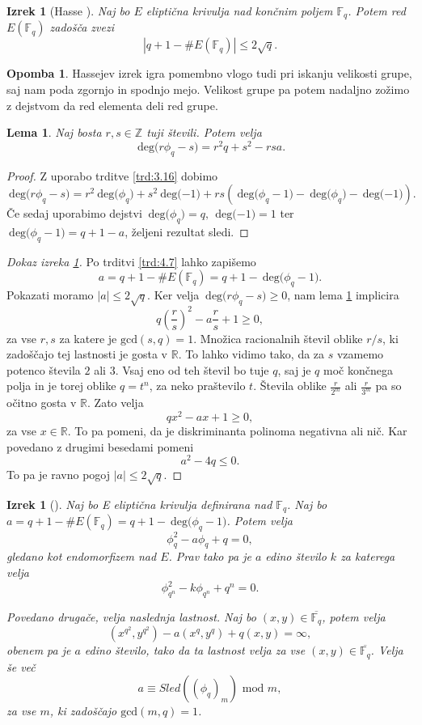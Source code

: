 \documentclass[12pt,a4paper,twoside]{article}
\theoremstyle{definition} %
\newtheorem{opomba}[definicija]{Opomba}
\theoremstyle{plain} %
\newtheorem{lema}[definicija]{Lema}
\newtheorem{izrek}[definicija]{Izrek}
\numberwithin{equation}{section}  %
\newcommand{\R}{\mathbb R}
\newcommand{\Z}{\mathbb Z}
\newcommand{\F}{\mathbb F}
\newcommand{\E}[1]{E({#1})}
\newcommand{\DEG}[1]{\ \text{deg(}{#1}\text{)}}
\begin{document}
\begin{izrek}[Hasse ]
\label{izr:Hasse}
Naj bo $E$ eliptična krivulja nad končnim poljem $\F_q$.  Potem red $\E{\F_q}$ zadošča zvezi
$$|q+1-\#\E{\F_q}| \leq 2\sqrt{q}.$$
\end{izrek}

\begin{opomba}
Hassejev izrek igra pomembno vlogo tudi pri iskanju velikosti grupe, saj nam poda zgornjo in spodnjo mejo. Velikost grupe pa potem nadaljno zožimo z dejstvom da red elementa deli red grupe. 
\end{opomba}

\begin{lema}
\label{lema:hasse}
Naj bosta $r,s \in \Z$ tuji števili. Potem velja
$$\DEG{r\phi_q-s} = r^2q+s^2-rsa.$$
\end{lema}

\begin{proof}
Z uporabo trditve \ref{trd:3.16} dobimo
$$\DEG{r\phi_q-s} = r^2\DEG{\phi_q}+s^2\DEG{-1}+rs(\DEG{\phi_q-1}-\DEG{\phi_q}-\DEG{-1}).$$
Če sedaj uporabimo dejstvi $\DEG{\phi_q} = q,\ \DEG{-1} = 1$ ter $\DEG{\phi_q-1} = q+1-a$, željeni rezultat sledi.
\end{proof}

\begin{proof}[Dokaz izreka \ref{izr:Hasse}]
Po trditvi \ref{trd:4.7} lahko zapišemo
$$a=q+1-\#\E{\F_q} = q+1 -\DEG{\phi_q-1}.$$
Pokazati moramo $|a| \leq 2\sqrt{q}.$
Ker velja $\DEG{r\phi_q-s} \geq 0$, nam lema \ref{lema:hasse} implicira
$$q \left( \frac{r}{s} \right)^2-a\frac{r}{s}+1 \geq 0,$$
za vse $r,s$ za katere je $\text{gcd}(s,q)=1$. Množica racionalnih števil oblike $r/s$, ki zadoščajo tej lastnosti je gosta v $\R$. To lahko vidimo tako, da za $s$ vzamemo potenco števila $2$ ali $3$. Vsaj eno od teh števil bo tuje $q$, saj je $q$ moč končnega polja in je torej oblike $q = t^n$, za neko praštevilo $t$. Števila oblike $\frac{r}{2^m}$ ali $\frac{r}{3^m}$ pa so očitno gosta v $\R$. Zato velja
$$qx^2-ax + 1 \geq 0,$$
za vse $x\in \R$. To pa pomeni, da je diskriminanta polinoma negativna ali nič. Kar povedano z drugimi besedami pomeni
$$a^2-4q \leq 0.$$
To pa je ravno pogoj $|a|\leq 2\sqrt{q}$.


\end{proof}


\begin{izrek}[]
\label{izrek:4.10}
Naj bo E eliptična krivulja definirana nad $\F_q$. Naj bo $a = q+1-\#\E{\F_q} = q+1-\DEG{\phi_q-1}$. Potem velja
$$\phi^2_q-a\phi_q+q = 0,$$
gledano kot endomorfizem nad $E$. Prav tako pa je $a$ edino število $k$ za katerega velja
$$\phi^2_{q^n}-k\phi_{q^n}+q^n = 0.$$

Povedano drugače, velja naslednja lastnost. Naj bo $(x,y) \in  \overline{\F_q}$, potem velja
$$(x^{q^2},y^{q^2})-a(x^q,y^q)+q(x,y) = \infty,$$
obenem pa je $a$ edino število, tako da ta lastnost velja za vse $(x,y) \in \overline{\F_q} $. Velja še več
$$a \equiv Sled((\phi_q)_m) \text{ mod } m,$$
za vse $m$, ki zadoščajo $\text{gcd}(m,q)=1$.

\end{izrek}
\end{document}
